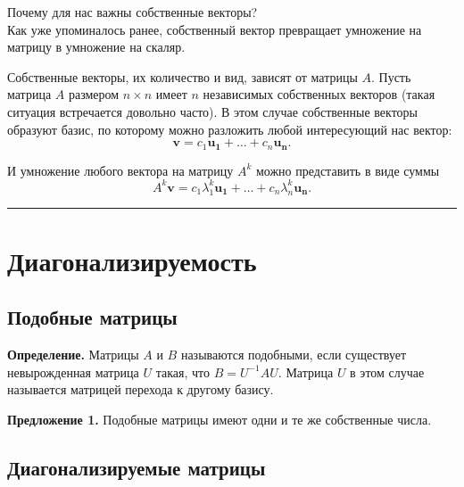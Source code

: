 \documentclass[11pt,a4paper]{article}
\renewcommand{\linethickness}{0.1ex}
\begin{document}
    Почему для нас важны собственные векторы?\\
Как уже упоминалось ранее, собственный вектор превращает умножение на
матрицу в умножение на скаляр.

Собственные векторы, их количество и вид, зависят от матрицы \(A\).
Пусть матрица \(A\) размером \(n \times n\) имеет \(n\) независимых
собственных векторов (такая ситуация встречается довольно часто). В этом
случае собственные векторы образуют базис, по которому можно разложить
любой интересующий нас вектор:
\[ \mathbf{v} = c_1\mathbf{u_1} + \ldots + c_n\mathbf{u_n}. \]

И умножение любого вектора на матрицу \(A^k\) можно представить в виде
суммы
\[ A^k\mathbf{v} = c_1\lambda_1^k\mathbf{u_1} + \ldots + c_n\lambda_n^k\mathbf{u_n}. \]

    \begin{center}\rule{0.5\linewidth}{\linethickness}\end{center}

    \hypertarget{ux434ux438ux430ux433ux43eux43dux430ux43bux438ux437ux438ux440ux443ux435ux43cux43eux441ux442ux44c}{%
\section{Диагонализируемость}\label{ux434ux438ux430ux433ux43eux43dux430ux43bux438ux437ux438ux440ux443ux435ux43cux43eux441ux442ux44c}}

\hypertarget{ux43fux43eux434ux43eux431ux43dux44bux435-ux43cux430ux442ux440ux438ux446ux44b}{%
\subsection{Подобные
матрицы}\label{ux43fux43eux434ux43eux431ux43dux44bux435-ux43cux430ux442ux440ux438ux446ux44b}}

\textbf{Определение.} Матрицы \(A\) и \(B\) называются подобными, если
существует невырожденная матрица \(U\) такая, что \(B = U^{-1}AU\).
Матрица \(U\) в этом случае называется матрицей перехода к другому
базису.

\textbf{Предложение 1.} Подобные матрицы имеют одни и те же собственные
числа.

    \hypertarget{ux434ux438ux430ux433ux43eux43dux430ux43bux438ux437ux438ux440ux443ux435ux43cux44bux435-ux43cux430ux442ux440ux438ux446ux44b}{%
\subsection{Диагонализируемые
матрицы}\label{ux434ux438ux430ux433ux43eux43dux430ux43bux438ux437ux438ux440ux443ux435ux43cux44bux435-ux43cux430ux442ux440ux438ux446ux44b}}
\end{document}
